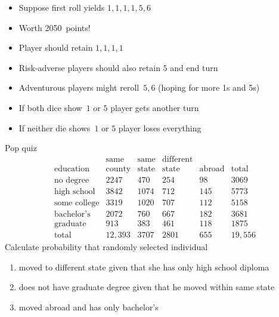 \documentclass[handout]{beamer}
\theoremstyle{definition}
\begin{document}
\begin{frame}
\begin{example}
\begin{itemize}
\item Suppose first roll yields $1,1,1,1,5,6$
\item Worth 2050~points!
\item Player should retain $1,1,1,1$
\item Risk-adverse players should also retain $5$ and end turn
\item Adventurous players might reroll~$5,6$ (hoping
for more 1s and 5s)
\item If both dice show~$1$ or $5$ player gets another
turn
\item If neither die shows~$1$ or $5$ player loses everything
\end{itemize}
\end{example}

\end{frame}

\begin{frame}{Pop quiz}
\[\begin{array}{r|llll|l}
&\text{same}&\text{same}&\text{different}&&\\
\text{education}&\text{county}
&\text{state}&\text{state}&\text{abroad}&\text{total}\\\hline
\text{no degree}&2247&470&254&98&3069\\
\text{high school}&3842&1074&712&145&5773\\
\text{some college}&3319&1020&707&112&5158\\
\text{bachelor's}&2072&760&667&182&3681\\
\text{graduate}&913&383&461&118&1875\\\hline
\text{total}&12,393&3707&2801&655&19,556
\end{array}\]
Calculate probability that
randomly selected individual
\begin{enumerate}
\item moved to different state given that she
has only high school diploma
\item does \alert{not} have graduate degree given that he moved
within same state
\item moved abroad \alert{and} has only bachelor's
\end{enumerate}
\end{frame}
\end{document}
